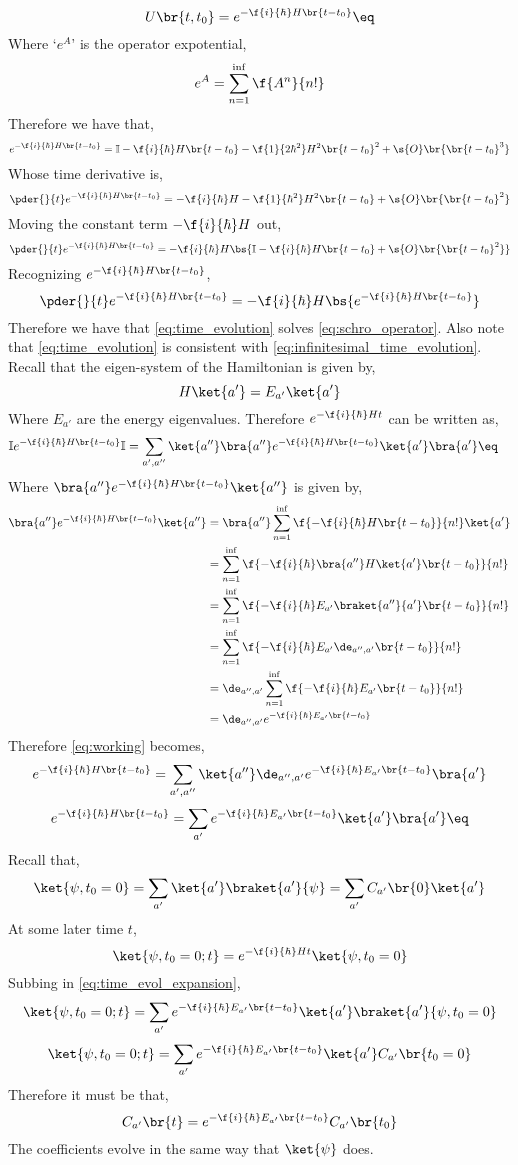 \documentclass{article}
\begin{document}
\[ U \br{t, t_0} = e^{-\f{i}{\hbar} H\br{t - t_0}} \eq \label{eq:time_evolution}\]
Where `$e^A$' is the operator expotential,
\[ e^{A} = \sum_{n=1}^{\inf} \f{A^n}{n!} \]
Therefore we have that,
\[ e^{-\f{i}{\hbar} H\br{t - t_0}} = \mathbb{I} -\f{i}{\hbar} H\br{t - t_0} -\f{1}{2\hbar^2} H^2\br{t - t_0}^2 + \s{O}\br{\br{t-t_0}^{3}}\]
Whose time derivative is,
\[ \pder{}{t}e^{-\f{i}{\hbar} H\br{t - t_0}} = -\f{i}{\hbar} H -\f{1}{\hbar^2} H^2\br{t - t_0} + \s{O}\br{\br{t-t_0}^{2}}\]
Moving the constant term $- \f{i}{\hbar} H$ out,
\[ \pder{}{t}e^{-\f{i}{\hbar} H\br{t - t_0}} =  - \f{i}{\hbar} H \bs{\mathbb{I} -\f{i}{\hbar} H \br{t -t_0} + \s{O}\br{\br{t-t_0}^{2}}}\]
Recognizing $e^{-\f{i}{\hbar} H\br{t - t_0}}$,
\[ \pder{}{t}e^{-\f{i}{\hbar} H\br{t - t_0}} =  - \f{i}{\hbar} H \bs{e^{-\f{i}{\hbar} H\br{t - t_0}}}\]
Therefore we have that \cref{eq:time_evolution} solves \cref{eq:schro_operator}. Also note that \cref{eq:time_evolution} is consistent with \cref{eq:infinitesimal_time_evolution}. \\

Recall that the eigen-system of the Hamiltonian is given by,
\[ H \ket{a'} = E_{a'} \ket{a'} \]
Where $E_{a'}$ are the energy eigenvalues. Therefore $e^{- \f{i}{\hbar} H t}$ can be written as,
\begin{align*}
    \mathbb{I} e^{-\f{i}{\hbar} H\br{t - t_0}} \mathbb{I} &= \sum_{a', a''} \ket{a''}\bra{a''} e^{-\f{i}{\hbar} H\br{t - t_0}} \ket{a'}\bra{a'} \eq \label{eq:working}
\end{align*}
Where $\bra{a''} e^{-\f{i}{\hbar} H\br{t - t_0}} \ket{a''}$ is given by,
\begin{align*}
    \bra{a''} e^{-\f{i}{\hbar} H\br{t - t_0}} \ket{a''} &= \bra{a''} \sum_{n=1}^{\inf} \f{-\f{i}{\hbar} H\br{t - t_0}}{n!} \ket{a'}\\
    &=  \sum_{n=1}^{\inf} \f{-\f{i}{\hbar} \bra{a''}H\ket{a'}\br{t - t_0}}{n!} \\
    &=  \sum_{n=1}^{\inf} \f{-\f{i}{\hbar} E_{a'}\braket{a''}{a'}\br{t - t_0}}{n!} \\
    &=  \sum_{n=1}^{\inf} \f{-\f{i}{\hbar} E_{a'}\de_{a'',a'}\br{t - t_0}}{n!} \\
    &=  \de_{a'',a'}\sum_{n=1}^{\inf} \f{-\f{i}{\hbar} E_{a'}\br{t - t_0}}{n!} \\
    &=  \de_{a'',a'}e^{-\f{i}{\hbar} E_{a'}\br{t - t_0}}
\end{align*}
Therefore \cref{eq:working} becomes,
\[ e^{-\f{i}{\hbar} H\br{t - t_0}} = \sum_{a', a''} \ket{a''}\de_{a'',a'}e^{-\f{i}{\hbar} E_{a'}\br{t - t_0}}\bra{a'} \]
\[ e^{-\f{i}{\hbar} H\br{t - t_0}} = \sum_{a'}e^{-\f{i}{\hbar} E_{a'}\br{t - t_0}}\ket{a'}\bra{a'} \eq \label{eq:time_evol_expansion}\]
Recall that,
\[ \ket{\psi, t_0 = 0} = \sum_{a'}\ket{a'} \braket{a'}{\psi} = \sum_{a'} C_{a'}\br{0}\ket{a'} \]
At some later time $t$,
\[ \ket{\psi, t_0 = 0; t} = e^{-\f{i}{\hbar} H t} \ket{\psi, t_0 = 0} \]
Subbing in \cref{eq:time_evol_expansion},
\[ \ket{\psi, t_0 = 0; t} = \sum_{a'}e^{-\f{i}{\hbar} E_{a'}\br{t - t_0}}\ket{a'}\braket{a'}{\psi, t_0 = 0}  \]
\[ \ket{\psi, t_0 = 0; t} = \sum_{a'}e^{-\f{i}{\hbar} E_{a'}\br{t - t_0}}\ket{a'}C_{a'}\br{t_0 = 0} \]
Therefore it must be that,
\[ C_{a'}\br{t} = e^{-\f{i}{\hbar} E_{a'}\br{t - t_0}} C_{a'}\br{t_0} \]
The coefficients evolve in the same way that $\ket{\psi}$ does.
\end{document}
